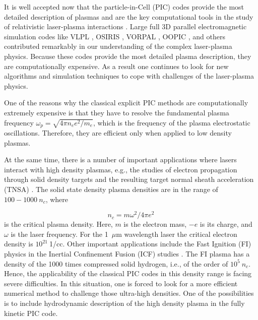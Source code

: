 \documentclass[conference]{IEEEtran}
\renewcommand{\~}{\widetilde }
\begin{document}
It is well accepted now that the particle-in-Cell (PIC) codes provide
the most detailed description of plasmas and are the key computational
tools in the study of relativistic laser-plasma
interactions \cite{birdsal,hockney}. Large full 3D parallel
electromagnetic simulation codes like VLPL \cite{vlpl}, OSIRIS
\cite{osiris}, VORPAL \cite{vorpal}, OOPIC \cite{oopic}, and others
contributed remarkably in our understanding of the complex
laser-plasma physics. Because these codes provide the most detailed
plasma description, they are computationally expensive. As a result
one continues to look for new 
algorithms and simulation techniques to cope with
challenges of the laser-plasma physics.

One of the reasons why the classical explicit PIC
methods are computationally extremely expensive is that they have to
resolve the fundamental plasma frequency $\omega _p=\sqrt{4\pi n_e e^2/m_e}$,
which is the frequency of the plasma electrostatic oscillations. 
Therefore, they are efficient only when applied to low density
plasmas.  

At the same time, there is a number of important applications where
lasers interact with high density plasmas, e.g., the studies of
electron propagation through solid density targets and the resulting
target normal sheath acceleration (TNSA) 
\cite{solid_experiments}. The solid state density plasma
densities are in the range of $100-1000~n_c$, where 

\begin{equation}
n_c = m\omega^2/4\pi e^2 \label{eq:n_c}
\end{equation}
\noindent is the critical 
plasma density. Here, $m$ is the electron mass, $-e$ is its charge,
and $\omega$ is the laser frequency. For the 1~$\mu$m wavelength laser
the critical electron density is $10^{21}~$1/cc. Other important applications
include the Fast Ignition (FI) physics in the Inertial Confinement
Fusion (ICF) studies \cite{FI}. The FI plasma has a density of the 1000 times
compressed solid hydrogen, i.e., of the order of $10^5~n_c$. Hence,
the applicability of the classical PIC codes in this density range 
is facing severe difficulties. In this situation, one is forced to look for
a more efficient numerical method to challenge those ultra-high
densities. One of the possibilities is to include hydrodynamic
description of the high density plasma in the fully kinetic PIC code.
\end{document}

